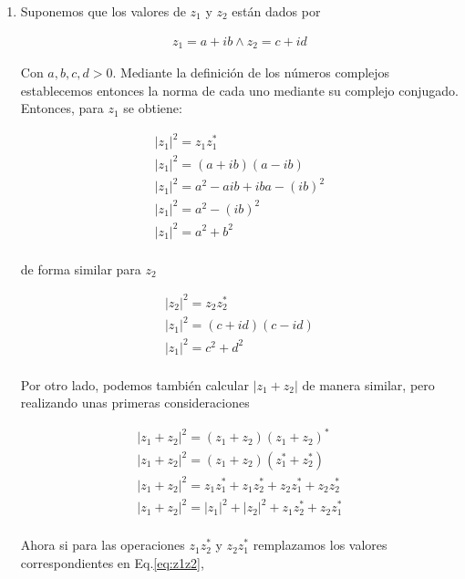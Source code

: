 \documentclass[12pt,spanish]{article}
\begin{document}
\begin{enumerate}
    
    \item Suponemos que los valores de $z_1$ y $z_2$ están dados por
    
        \begin{gather}
            z_1 = a + ib \wedge z_2 = c + id
            \label{eq:z1z2}
        \end{gather}

        Con $a,b,c,d > 0$. Mediante la definición de los números complejos establecemos entonces la norma de cada uno mediante su complejo conjugado. Entonces, para $z_1$ se obtiene:

        \begin{gather*}
            |z_1|^2  = z_1z_1^{*}\\
            |z_1|^2  = (a + ib)(a - ib)\\
            |z_1|^2  = a^2 - aib + iba - (ib)^2\\
            |z_1|^2  = a^2 - (ib)^2\\
            |z_1|^2  = a^2 + b^2\\
        \end{gather*}

        de forma similar para $z_2$

        \begin{gather*}
            |z_2|^2  = z_2z_2^{*}\\
            |z_1|^2  = (c + id)(c - id)\\
            |z_1|^2  = c^2 + d^2\\
        \end{gather*}

        Por otro lado, podemos también calcular $|z_1 + z_2|$ de manera similar, pero realizando unas primeras consideraciones 

        \begin{gather*}
            |z_1 + z_2|^2 = (z_1 + z_2)(z_1 + z_2)^{*}\\
            |z_1 + z_2|^2 = (z_1 + z_2)(z_1^{*} + z_2^{*})\\
            |z_1 + z_2|^2 = z_1z_1^{*} + z_1z_2^{*} + z_2z_1^{*} + z_2z_2^{*}\\
            |z_1 + z_2|^2 = |z_1|^2 + |z_2|^2 + z_1z_2^{*} + z_2z_1^{*} \\
        \end{gather*}

        Ahora si para las operaciones $z_1z_2^{*}$ y $z_2z_1^{*}$ remplazamos los valores correspondientes en Eq.\ref*{eq:z1z2},


\end{enumerate}
\end{document}
